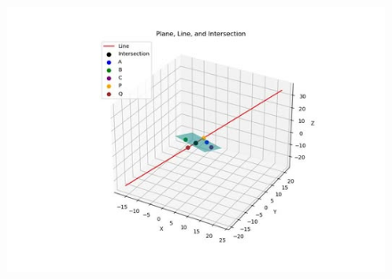 \documentclass[journal]{IEEEtran}
\begin{document}
\begin{figure}[H]
    \centering
    \includegraphics[scale=0.7]{figs/4.4.12.jpg}
    \caption{}
    \label{fig:1}
\end{figure}
\end{document}
